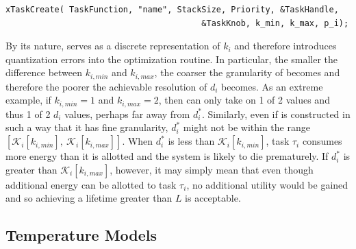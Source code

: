 \begin{verbatim}
xTaskCreate( TaskFunction, "name", StackSize, Priority, &TaskHandle,
                                        &TaskKnob, k_min, k_max, p_i);
\end{verbatim}

By its nature,  serves as a discrete representation of $k_i$ and therefore introduces quantization errors into the optimization routine.  In particular, the smaller the difference between $k_{i,min}$ and $k_{i,max}$, the coarser the granularity of  becomes and therefore the poorer the achievable resolution of $d_i$ becomes.  As an extreme example, if $k_{i,min} = 1$ and $k_{i,max} = 2$, then  can only take on 1 of 2 values and thus 1 of 2 $d_i$ values, perhaps far away from $d_i^*$. Similarly, even if  is constructed in such a way that it has fine granularity, $d_i^*$ might not be within the range $[\mathcal{K}_i[k_{i,min}],~\mathcal{K}_i[k_{i,max}]]$. When $d_i^*$ is less than $\mathcal{K}_i[k_{i,min}]$, task $\tau_i$ consumes more energy than it is allotted and the system is likely to die prematurely.  If $d_i^*$ is greater than $\mathcal{K}_i[k_{i,max}]$, however, it may simply mean that even though additional energy can be allotted to task $\tau_i$, no additional utility would be gained and so achieving a lifetime greater than $L$ is acceptable. 

\subsection{Temperature Models}

